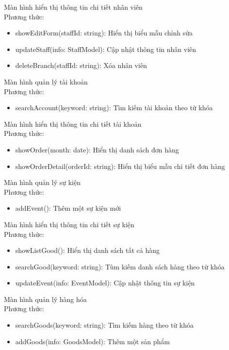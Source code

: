 Màn hình hiển thị thông tin chi tiết nhân viên\\ 
Phương thức:
\begin{itemize}
	\item showEditForm(staffId: string): Hiển thị biểu mẫu chỉnh sửa
	\item updateStaff(info: StaffModel): Cập nhật thông tin nhân viên
	\item deleteBranch(staffId: string): Xóa nhân viên
\end{itemize}

Màn hình quản lý tài khoản\\ 
Phương thức:
\begin{itemize}
	\item searchAccount(keyword: string): Tìm kiếm tài khoản theo từ khóa
\end{itemize}


Màn hình hiển thị thông tin chi tiết tài khoản\\ 
Phương thức:
\begin{itemize}
	\item showOrder(month: date): Hiển thị danh sách đơn hàng
	\item showOrderDetail(orderId: string): Hiển thị biểu mẫu chi tiết đơn hàng  
\end{itemize}

Màn hình quản lý sự kiện\\ 
Phương thức:
\begin{itemize}
	\item addEvent(): Thêm một sự kiện mới
\end{itemize}

Màn hình hiển thị thông tin chi tiết sự kiện\\ 
Phương thức:
\begin{itemize}
	\item showListGood(): Hiển thị danh sách tất cả hàng
	\item searchGood(keyword: string): Tùm kiếm danh sách hàng theo từ khóa
	\item updateEvent(info: EventModel): Cập nhật thông tin sự kiện
\end{itemize}

Màn hình quản lý hàng hóa\\ 
Phương thức:
\begin{itemize}
	\item searchGoods(keyword: string): Tìm kiếm hàng theo từ khóa
	\item addGoods(info: GoodsModel): Thêm một sản phẩm
\end{itemize}

